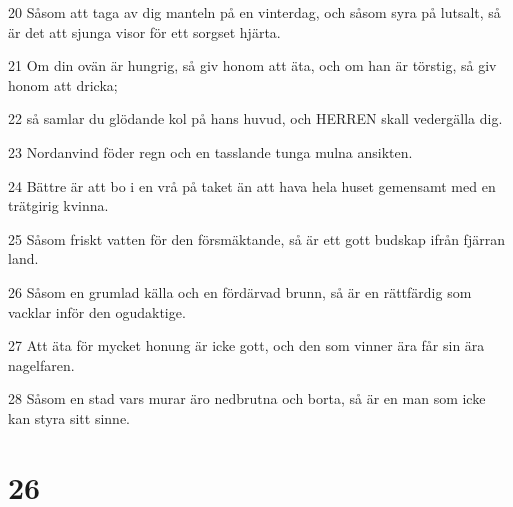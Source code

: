 \par 20 Såsom att taga av dig manteln på en vinterdag, och såsom syra på lutsalt, så är det att sjunga visor för ett sorgset hjärta.
\par 21 Om din ovän är hungrig, så giv honom att äta, och om han är törstig, så giv honom att dricka;
\par 22 så samlar du glödande kol på hans huvud, och HERREN skall vedergälla dig.
\par 23 Nordanvind föder regn och en tasslande tunga mulna ansikten.
\par 24 Bättre är att bo i en vrå på taket än att hava hela huset gemensamt med en trätgirig kvinna.
\par 25 Såsom friskt vatten för den försmäktande, så är ett gott budskap ifrån fjärran land.
\par 26 Såsom en grumlad källa och en fördärvad brunn, så är en rättfärdig som vacklar inför den ogudaktige.
\par 27 Att äta för mycket honung är icke gott, och den som vinner ära får sin ära nagelfaren.
\par 28 Såsom en stad vars murar äro nedbrutna och borta, så är en man som icke kan styra sitt sinne.

\chapter{26}

